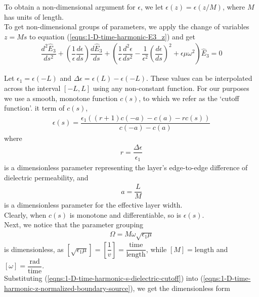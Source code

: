 \documentclass[12pt,twoside]{report}
\begin{document}
To obtain a non-dimensional argument for $\epsilon$, we let $\epsilon(z) = \epsilon(z/M)$, where $M$ has units of length. \\
To get non-dimensional groups of parameters, we apply the change of variables $z= M s$ to equation (\ref{eqns:1-D-time-harmonic-E3_z}) and get
\begin{align}
\label{eqns:1-D-time-harmonic-z-normalized-boundary-source}
\dfrac{d^2\hat{E}_3}{ds^2} + \left( \dfrac{1}{\epsilon}\dfrac{d \epsilon}{ds}\right)\dfrac{d\hat{E}_3}{ds}
+ \left( \dfrac{1}{\epsilon}\dfrac{d^2\epsilon}{ds^2}
-\dfrac{1}{\epsilon^2}\left( \dfrac{d\epsilon}{ds}\right)^2 + \epsilon \mu \omega^2\right)\hat{E}_3 = 0
\end{align}

Let $\epsilon_1 = \epsilon(-L)$ and $\Delta \epsilon = \epsilon(L)-\epsilon(-L)$. These values can be interpolated across the interval $[-L,L]$ using any non-constant function. For our purposes we use a smooth, monotone function $c(s)$, to which we refer as the `cutoff function'. it term of $c(s)$, 
\begin{align}
\label{eqns:1-D-time-harmonic-s-dielectric-cutoff}
\epsilon(s) = \dfrac{\epsilon_1 ((r+1) c(-a)-c(a)-r c(s))}{c(-a)-c(a)}
\end{align}
where 
\begin{align}
r = \dfrac{\Delta \epsilon}{\epsilon_1}
\end{align} 
is a dimensionless parameter representing the layer's edge-to-edge difference of dielectric permeability, and
\begin{align}
a = \dfrac{L}{M}
\end{align} 
is a dimensionless parameter for the effective layer width.\\
Clearly, when $c(s)$ is monotone and differentiable, so is $\epsilon(s)$.\\


Next, we notice that the parameter grouping  
\begin{align}
\label{eqns:1_D-time-harmonic-normalized-freq}
\Omega = M \omega \sqrt{\epsilon_1 \mu}
\end{align}
is dimensionless, as $[\sqrt{\epsilon_1 \mu}] = \left[ \dfrac{1}{v}\right] = \dfrac{\text{time}}{\text{length}}$, while $[M] = \text{length}$ and $[\omega] = \dfrac{\text{rad}}{\text{time}}$. \\


Substituting (\ref{eqns:1-D-time-harmonic-s-dielectric-cutoff}) into (\ref{eqns:1-D-time-harmonic-z-normalized-boundary-source}), we get the dimensionless form 
\end{document}
